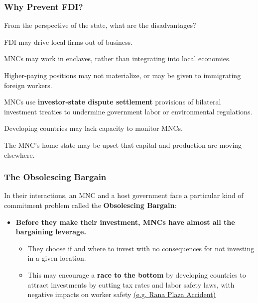 \documentclass{beamer}
\begin{document}
\begin{frame} 
	\frametitle{\LARGE{Why Prevent FDI?}}
	From the perspective of the state, what are the disadvantages?
	\begin{itemize}
		\large{
			\item FDI may drive local firms out of business. \pause 
			
			\item MNCs may work in enclaves, rather than integrating into local economies.   \pause
			\item Higher-paying positions may not materialize, or may be given to immigrating foreign workers. \pause 
			
			\item MNCs use \textbf{investor-state dispute settlement} provisions of bilateral investment treaties to undermine government labor or environmental regulations. \pause 
			
			\item Developing countries may lack capacity to monitor MNCs.  \pause 
			
			\item The MNC's home state may be upset that capital and production are moving elsewhere. 
		}
	\end{itemize}
\end{frame}



\begin{frame} 
	\frametitle{\LARGE{The Obsolescing Bargain}}
	In their interactions, an MNC and a host government face a particular kind of commitment problem called the \textbf{Obsolescing Bargain}:
	\begin{itemize}
		\item \textbf{Before they make their investment, MNCs have almost all the bargaining leverage.} \pause 
		\begin{itemize}
			\item They choose if and where to invest with no consequences for not investing in a given location. \pause 
			\item This may encourage a \textbf{race to the bottom} by developing countries to attract investments by cutting tax rates and labor safety laws, with negative impacts on worker safety \href{https://www.ilo.org/global/topics/geip/WCMS_614394/lang--en/index.htm}{(e.g. Rana Plaza Accident)}  
		\end{itemize}
	\end{itemize} 
\end{frame}
\end{document}
